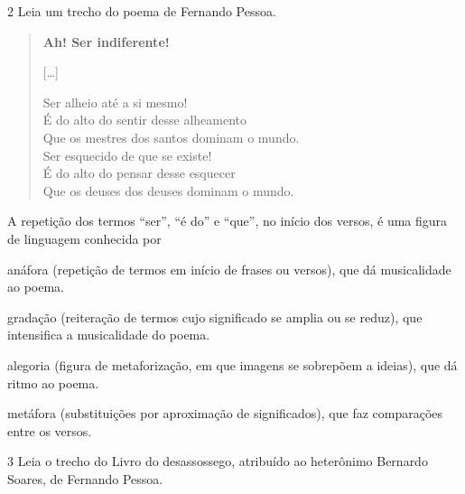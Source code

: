 
\pagebreak
\num{2} Leia um trecho do poema de Fernando Pessoa.


\begin{verse}
\textbf{Ah! Ser indiferente!}

{[}\ldots{}{]}

Ser alheio até a si mesmo!\\
É do alto do sentir desse alheamento\\
Que os mestres dos santos dominam o mundo.\\
Ser esquecido de que se existe!\\
É do alto do pensar desse esquecer\\
Que os deuses dos deuses dominam o mundo.

\end{verse}


A repetição dos termos ``ser'', ``é do'' e ``que'', no início dos
versos, é uma figura de linguagem conhecida por

\begin{escolha}
\item anáfora (repetição de termos em início de frases ou versos), que dá
musicalidade ao poema.

\item gradação (reiteração de termos cujo significado se amplia ou se
reduz), que intensifica a musicalidade do poema.

\item alegoria (figura de metaforização, em que imagens se sobrepõem a
ideias), que dá ritmo ao poema.

\item metáfora (substituições por aproximação de significados), que faz
comparações entre os versos.
\end{escolha}


\num{3} Leia o trecho do Livro do desassossego, atribuído ao heterônimo Bernardo Soares, de Fernando Pessoa.

